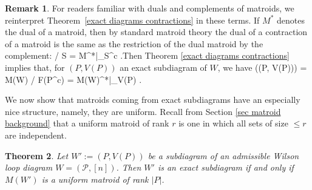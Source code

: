 \documentclass[11pt]{article}
\def\bas #1\eas{\begin{align*} #1 \end{align*}}
\newcommand{\cP}{\mathcal{P}}
\newtheorem{thm}{Theorem}[section]
\theoremstyle{remark}
\theoremstyle{definition}
\newtheorem{rmk}[thm]{Remark}
\begin{document}
\begin{rmk} \label{remark exact dual restiction} For readers familiar with duals and complements of matroids, we reinterpret Theorem~\ref{exact diagrams contractions} in these terms. If $M^*$ denotes the dual of a matroid, then by standard matroid theory \cite{OxleyMatroidBook} the dual of a contraction of a matroid is the same as the restriction of the dual matroid by the complement: \bas M / S = M^*|_{S^c} \;.\eas Then Theorem \ref{exact diagrams contractions} implies that, for $(P, V(P))$ an exact subdiagram of $W$, we have \bas M\big((P, V(P))\big) = M(W)  / F(P^c) = M(W)^*|_{V(P)} \;.\eas
\end{rmk}

We now show that matroids coming from exact subdiagrams have an especially nice structure, namely, they are uniform. Recall from Section \ref{sec matroid background} that a uniform matroid of rank $r$ is one in which all sets of size $ \leq r$ are independent.


\begin{thm} \label{exactuniformthm}
Let $W':= (P, V(P))$ be a subdiagram of an admissible Wilson loop diagram $W= (\cP, [n])$. Then $W'$ is an exact subdiagram if and only if $M(W')$ is a uniform matroid of rank $|P|$.
\end{thm}
\end{document}
